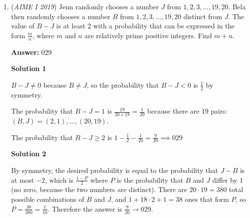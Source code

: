 \begin{enumerate}
 



\textbf{Solution 4 (Official MAA)}

Write 
 \begin{align*}N &=(10-1)+(10^2-1)+\cdots+(10^{321}-1)\\ &=10+10^2+10^3+10^4+10^5+10^6+\cdots 10^{321}-321 \\ &=1110-321+10^4+10^5+10^6+\cdots+10^{321}\\ &=789+10^4+10^5+10^6+\cdots+10^{321}\\ \end{align*}
The sum of the digits of $N$ is therefore equal to $7+8+9+(321-3)=342$.

 


 


	\item (\textit{AIME I 2019}) Jenn randomly chooses a number $J$ from $1, 2, 3,\ldots, 19, 20$. Bela then randomly chooses a number $B$ from $1, 2, 3,\ldots, 19, 20$ distinct from $J$. The value of $B - J$ is at least $2$ with a probability that can be expressed in the form $\frac{m}{n}$, where $m$ and $n$ are relatively prime positive integers. Find $m+n$.


 
 \textbf{Answer: }029



\textbf{Solution 1}

$B-J \ne 0$ because $B \ne J$, so the probability that $B-J < 0$ is $\frac{1}{2}$ by symmetry.

 The probability that $B-J = 1$ is $\frac{19}{20 \times 19} = \frac{1}{20}$ because there are 19 pairs: $(B,J) = (2,1), \ldots, (20,19)$.

 The probability that $B-J \ge 2$ is $1-\frac{1}{2}-\frac{1}{20} = \frac{9}{20} \implies \boxed{029}$




\textbf{Solution 2}

By symmetry, the desired probability is equal to the probability that $J - B$ is at most $-2$, which is $\frac{1-P}{2}$ where $P$ is the probability that $B$ and $J$ differ by $1$ (no zero, because the two numbers are distinct). There are $20 \cdot 19 = 380$ total possible combinations of $B$ and $J$, and $1 + 18 \cdot 2 + 1 = 38$ ones that form $P$, so $P = \frac{38}{380} = \frac{1}{10}$. Therefore the answer is $\frac{9}{20} \rightarrow \boxed{029}$.

 




\end{enumerate}
